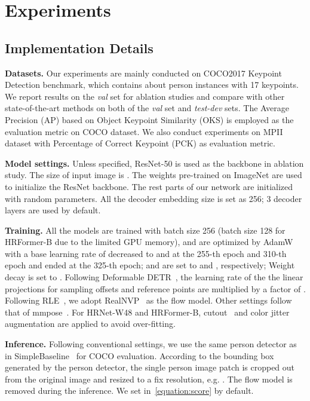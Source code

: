 \documentclass[runningheads]{llncs}
\begin{document}
\section{Experiments}










\subsection{Implementation Details}
\noindent\textbf{Datasets.} 
Our experiments are mainly conducted on COCO2017 Keypoint Detection\cite{wang2018mscoco} benchmark, which contains about  person instances with 17 keypoints. 
We report results on the \emph{val} set for ablation studies and compare with other state-of-the-art methods on both of the \emph{val} set and \emph{test-dev} sets. The Average Precision (AP) based on Object Keypoint Similarity (OKS) is employed as the evaluation metric on COCO dataset. We also conduct experiments on MPII~\cite{mpii} dataset with Percentage of Correct Keypoint (PCK) as evaluation metric.



\noindent\textbf{Model settings.} 
Unless specified, ResNet-50\cite{he2016deep} is used as the backbone in ablation study. 
The size of input image is .
The weights pre-trained on ImageNet\cite{deng2009imagenet} are used to initialize the ResNet backbone. The rest parts of our network are initialized with random parameters. All the decoder embedding size is set as 256; 3 decoder layers are used by default.


\noindent\textbf{Training.}  All the models are trained with batch size 256 (batch size 128 for HRFormer-B due to the limited GPU memory), and are optimized by AdamW\cite{loshchilov2017decoupled} with a base learning rate of  decreased to  and  at the 255-th epoch and 310-th epoch and ended at the 325-th epoch; 
 and  are set to  and , respectively;
Weight decay is set to . 
Following Deformable DETR~\cite{zhu2020deformable}, the learning rate of the the linear projections for sampling offsets and reference points are multiplied by a factor of . Following RLE~\cite{li2021rle}, we adopt RealNVP~\cite{realnvp} as the flow model. Other settings follow that of mmpose~\cite{mmpose2020}. For HRNet-W48 and HRFormer-B, cutout~\cite{devries2017improved} and color jitter augmentation are applied to avoid over-fitting.


\noindent\textbf{Inference. }
Following conventional settings, we use the same person detector as in SimpleBaseline~\cite{xiao2018simple} for COCO evaluation.
According to the bounding box generated by the person detector, the single person image patch is cropped out from the original image and resized to a fix resolution, e.g.  . The flow model is removed during the inference. We set  in~\cref{equation:score} by default.
\end{document}
